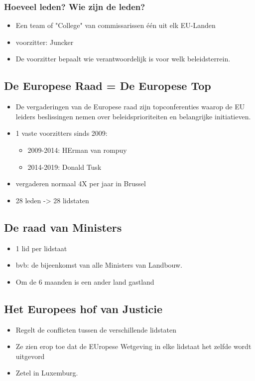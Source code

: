 \documentclass{article}
\begin{document}
\subsubsection{Hoeveel leden? Wie zijn de leden?}
\begin{itemize}
    \item Een team of "College" van commissarissen één uit elk EU-Landen
    \item voorzitter: Juncker
    \item De voorzitter bepaalt wie verantwoordelijk is voor welk beleidsterrein.
\end{itemize}
    
\subsection{De Europese Raad = De Europese Top}
\begin{itemize}
    \item De vergaderingen van de Europese raad zijn topconferenties waarop de EU leiders beslissingen nemen over beleidsprioriteiten en belangrijke initiatieven.
    \item 1 vaste voorzitters sinds 2009:
    \begin{itemize}
        \item 2009-2014: HErman van rompuy
        \item 2014-2019: Donald Tusk
    \end{itemize}
    \item vergaderen normaal 4X per jaar in Brussel
    \item 28 leden -> 28 lidstaten
\end{itemize}

\subsection{De raad van Ministers}
\begin{itemize}
    \item 1 lid per lidstaat
    \item bvb: de bijeenkomst van alle Ministers van Landbouw.
    \item Om de 6 maanden is een ander land gastland 
\end{itemize}

\subsection{Het Europees hof van Justicie}
\begin{itemize}
    \item Regelt de conflicten tussen de verschillende lidstaten
    \item Ze zien erop toe dat de EUropese Wetgeving in elke lidstaat het zelfde wordt uitgevord
    \item Zetel in Luxemburg.
\end{itemize}
\end{document}
